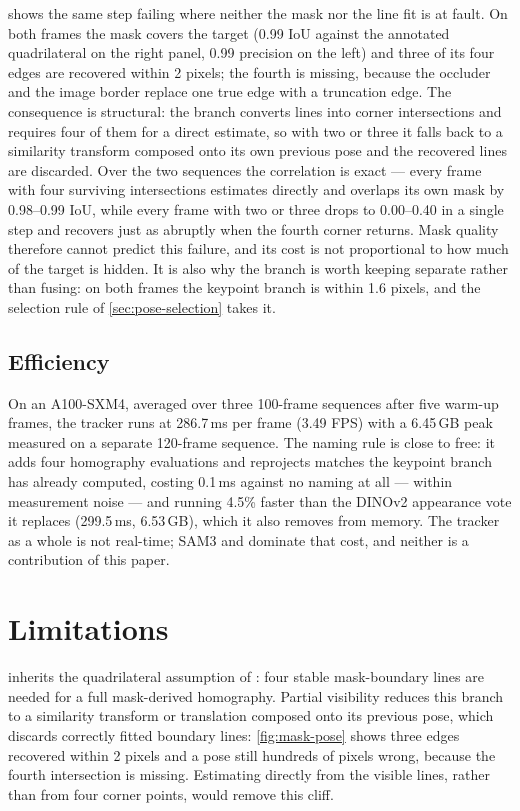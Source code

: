 \documentclass[10pt,twocolumn,letterpaper]{article}
\begin{document}
 shows the same step failing where neither the mask nor the line fit is at fault.
On both frames the mask covers the target (0.99 IoU against the annotated quadrilateral on the right panel, 0.99 precision on the left) and three of its four edges are recovered within 2 pixels; the fourth is missing, because the occluder and the image border replace one true edge with a truncation edge.
The consequence is structural: the branch converts lines into corner intersections and requires four of them for a direct estimate, so with two or three it falls back to a similarity transform composed onto its own previous pose and the recovered lines are discarded.
Over the two sequences the correlation is exact --- every frame with four surviving intersections estimates directly and overlaps its own mask by 0.98--0.99 IoU, while every frame with two or three drops to 0.00--0.40 in a single step and recovers just as abruptly when the fourth corner returns.
Mask quality therefore cannot predict this failure, and its cost is not proportional to how much of the target is hidden.
It is also why the branch is worth keeping separate rather than fusing: on both frames the keypoint branch is within 1.6 pixels, and the selection rule of \cref{sec:pose-selection} takes it.

\subsection{Efficiency}
\label{sec:efficiency}

On an A100-SXM4, averaged over three 100-frame \pttst sequences after five warm-up frames, the tracker runs at 286.7\,ms per frame (3.49 FPS) with a 6.45\,GB peak measured on a separate 120-frame sequence.
The naming rule is close to free: it adds four homography evaluations and reprojects matches the keypoint branch has already computed, costing 0.1\,ms against no naming at all --- within measurement noise --- and running 4.5\% faster than the DINOv2 appearance vote it replaces (299.5\,ms, 6.53\,GB), which it also removes from memory.
The tracker as a whole is not real-time; SAM3 and \loma dominate that cost, and neither is a contribution of this paper.
\section{Limitations}
\label{sec:limitations}

\flatsam inherits the quadrilateral assumption of \samh: four stable mask-boundary lines are needed for a full mask-derived homography.
Partial visibility reduces this branch to a similarity transform or translation composed onto its previous pose, which discards correctly fitted boundary lines: \cref{fig:mask-pose} shows three edges recovered within 2 pixels and a pose still hundreds of pixels wrong, because the fourth intersection is missing.
Estimating directly from the visible lines, rather than from four corner points, would remove this cliff.
\end{document}
